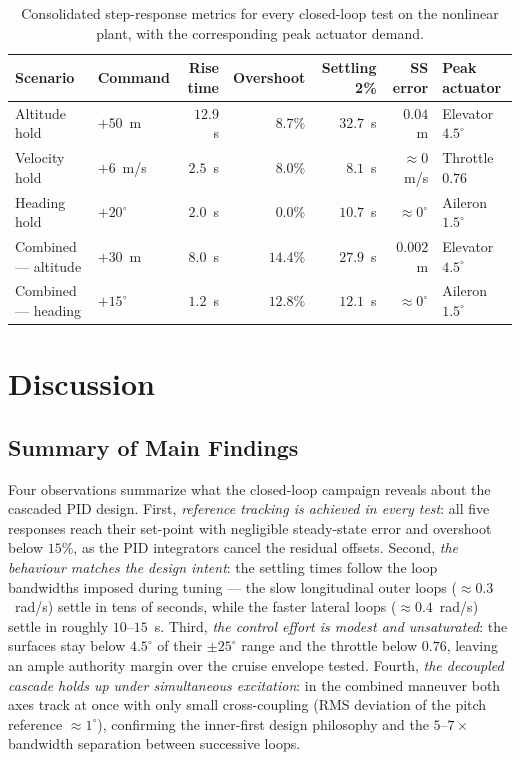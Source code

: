 \documentclass{ieeeaccess}
\begin{document}
\begin{table}[!htbp]
\caption{Consolidated step-response metrics for every closed-loop test on the nonlinear plant, with the corresponding peak actuator demand.}
\label{tab:summary}
\centering
\begin{tabular}{llrrrrl}
\hline
\textbf{Scenario} & \textbf{Command} & \textbf{Rise time} & \textbf{Overshoot} & \textbf{Settling 2\%} & \textbf{SS error} & \textbf{Peak actuator} \\
\hline
Altitude hold        & $+50$~m   & $12.9$~s & $8.7\%$  & $32.7$~s & $0.04$~m  & Elevator $4.5^\circ$ \\
Velocity hold        & $+6$~m/s  & $2.5$~s  & $8.0\%$  & $8.1$~s  & $\approx 0$~m/s & Throttle $0.76$ \\
Heading hold         & $+20^\circ$ & $2.0$~s & $0.0\%$  & $10.7$~s & $\approx 0^\circ$ & Aileron $1.5^\circ$ \\
Combined --- altitude & $+30$~m   & $8.0$~s  & $14.4\%$ & $27.9$~s & $0.002$~m & Elevator $4.5^\circ$ \\
Combined --- heading  & $+15^\circ$ & $1.2$~s & $12.8\%$ & $12.1$~s & $\approx 0^\circ$ & Aileron $1.5^\circ$ \\
\hline
\end{tabular}
\end{table}

\section{Discussion}
\label{sec:discussion}

\subsection{Summary of Main Findings}

Four observations summarize what the closed-loop campaign reveals about the cascaded PID design. First, \textit{reference tracking is achieved in every test}: all five responses reach their set-point with negligible steady-state error and overshoot below $15\%$, as the PID integrators cancel the residual offsets. Second, \textit{the behaviour matches the design intent}: the settling times follow the loop bandwidths imposed during tuning --- the slow longitudinal outer loops ($\approx 0.3$~rad/s) settle in tens of seconds, while the faster lateral loops ($\approx 0.4$~rad/s) settle in roughly $10$--$15$~s. Third, \textit{the control effort is modest and unsaturated}: the surfaces stay below $4.5^\circ$ of their $\pm 25^\circ$ range and the throttle below $0.76$, leaving an ample authority margin over the cruise envelope tested. Fourth, \textit{the decoupled cascade holds up under simultaneous excitation}: in the combined maneuver both axes track at once with only small cross-coupling (RMS deviation of the pitch reference $\approx 1^\circ$), confirming the inner-first design philosophy and the $5$--$7\times$ bandwidth separation between successive loops.
\end{document}
